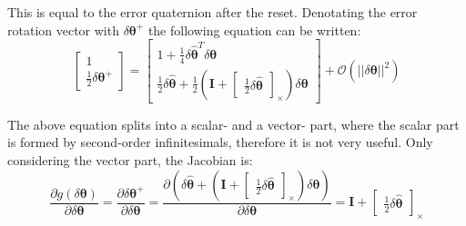 This is equal to the error quaternion after the reset. Denotating the error rotation vector with $\delta\boldsymbol{\theta}^+$ the following equation can be written:
\begin{equation}
    \begin{bmatrix}
        1 \\ \frac{1}{2}\delta\boldsymbol{\theta}^+
    \end{bmatrix}=\begin{bmatrix}
        1+\frac{1}{4}\delta\hat{\boldsymbol{\theta}}^T\delta\boldsymbol{\theta} \\
        \frac{1}{2}\delta\hat{\boldsymbol{\theta}}+\frac{1}{2}\left(\mathbf{I}+\begin{bmatrix}
            \frac{1}{2}\delta\hat{\boldsymbol{\theta}}
        \end{bmatrix}_\times\right)\delta\boldsymbol{\theta}
    \end{bmatrix}+\mathcal{O}(||\delta\boldsymbol{\theta}||^2) 
\end{equation}

The above equation splits into a scalar- and a vector- part, where the scalar part is formed by second-order infinitesimals, therefore it is not very useful. Only considering the vector part, the Jacobian is:
\begin{equation}
    \frac{\partial g(\delta\boldsymbol{\theta})}{\partial\delta\boldsymbol{\theta}}=
    \frac{\partial\delta\boldsymbol{\theta}^+}{\partial\delta\boldsymbol{\theta}}=
    \frac{\partial\left(\delta\hat{\boldsymbol{\theta}}+\left(\mathbf{I}+\begin{bmatrix} \frac{1}{2}\delta\hat{\boldsymbol{\theta}} 
    \end{bmatrix}_\times\right)\delta\boldsymbol{\theta}\right)}{\partial\delta\boldsymbol{\theta}} =
    \mathbf{I}+\begin{bmatrix} \frac{1}{2}\delta\hat{\boldsymbol{\theta}} \end{bmatrix}_\times
\end{equation}